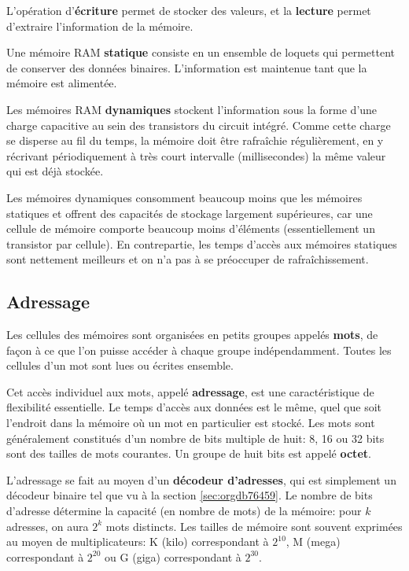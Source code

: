 \documentclass[11pt]{article}
\begin{document}
L'opération d'\textbf{écriture} permet de stocker des valeurs, et la
\textbf{lecture} permet d'extraire l'information de la mémoire.

Une mémoire RAM \textbf{statique} consiste en un ensemble de loquets qui
permettent de conserver des données binaires. L'information est
maintenue tant que la mémoire est alimentée. 

Les mémoires RAM \textbf{dynamiques} stockent l'information sous la forme
d'une charge capacitive au sein des transistors du circuit
intégré. Comme cette charge se disperse au fil du temps, la mémoire
doit être rafraîchie régulièrement, en y récrivant périodiquement à
très court intervalle (millisecondes) la même valeur qui est déjà
stockée.

Les mémoires dynamiques consomment beaucoup moins que les mémoires
statiques et offrent des capacités de stockage largement supérieures,
car une cellule de mémoire comporte beaucoup moins d'éléments
(essentiellement un transistor par cellule). En contrepartie, les
temps d'accès aux mémoires statiques sont nettement meilleurs et on
n'a pas à se préoccuper de rafraîchissement.

\subsection{Adressage}
\label{sec:orga8fe691}

Les cellules des mémoires sont organisées en petits groupes appelés
\textbf{mots}, de façon à ce que l'on puisse accéder à chaque groupe
indépendamment. Toutes les cellules d'un mot sont lues ou écrites
ensemble.

Cet accès individuel aux mots, appelé \textbf{adressage}, est une
caractéristique de flexibilité essentielle. Le temps d'accès aux
données est le même, quel que soit l'endroit dans la mémoire où un mot
en particulier est stocké. Les mots sont généralement constitués d'un
nombre de bits multiple de huit: 8, 16 ou 32 bits sont des tailles de
mots courantes. Un groupe de huit bits est appelé \textbf{octet}.

L'adressage se fait au moyen d'un \textbf{décodeur d'adresses}, qui est
simplement un décodeur binaire tel que vu à la section \ref{sec:orgdb76459}. Le
nombre de bits d'adresse détermine la capacité (en nombre de mots) de
la mémoire: pour \(k\) adresses, on aura \(2^k\) mots distincts. Les
tailles de mémoire sont souvent exprimées au moyen de multiplicateurs:
K (kilo) correspondant à \(2^{10}\), M (mega) correspondant à \(2^{20}\)
ou G (giga) correspondant à \(2^{30}\).
\end{document}
